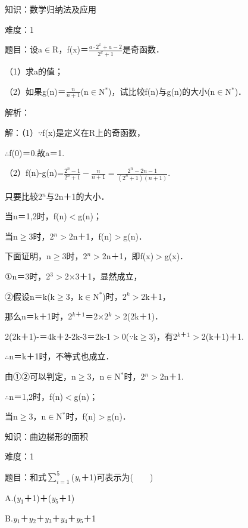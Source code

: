 \documentclass{article} %
\begin{document}
 知识：数学归纳法及应用

 难度：1

 题目：设a$\mathrm{\in}$R，f(x)＝$\frac{a\cdot 2^x+a-2}{2^x+1}$是奇函数．

（1）求a的值；

（2）如果g(n)＝$\frac{n}{n+1}$(n$\mathrm{\in}$N${}^{*}$)，试比较f(n)与g(n)的大小(n$\mathrm{\in}$N${}^{*}$)．

 解析：

 解：（1）$\mathrm{\because}$f(x)是定义在R上的奇函数，

$\mathrm{\therefore}$f(0)＝0.故a＝1.

（2）f(n)-g(n)=$\frac{2^n-1}{2^n+1}-\frac{n}{n+1}=\frac{2^n-2n-1}{(2^n+1)(n+1)}$.

只要比较2${}^{n}$与2n＋1的大小．

当n＝1,2时，f(n)$\mathrm{<}$g(n)；

当n$\mathrm{\ge}$3时，2${}^{n}$$\mathrm{>}$2n＋1，f(n)$\mathrm{>}$g(n)．

下面证明，n$\mathrm{\ge}$3时，2${}^{n}$$\mathrm{>}$2n＋1，即f(x)$\mathrm{>}$g(x)．

①n＝3时，2${}^{3}$$\mathrm{>}$2$\mathrm{\times}$3＋1，显然成立，

②假设n＝k(k$\mathrm{\ge}$3，k$\mathrm{\in}$N${}^{*}$)时，2${}^{k}$$\mathrm{>}$2k＋1，

那么n＝k＋1时，2${}^{k}$${}^{\textrm{＋}}$${}^{1}$＝2$\mathrm{\times}$2${}^{k}$$\mathrm{>}$2(2k＋1)．

2(2k＋1)-＝4k＋2-2k-3＝2k-1$\mathrm{>}$0($\mathrm{\because}$k$\mathrm{\ge}$3)，有2${}^{k}$${}^{\textrm{＋}}$${}^{1}$$\mathrm{>}$2(k＋1)＋1.

$\mathrm{\therefore}$n＝k＋1时，不等式也成立．

由①②可以判定，n$\mathrm{\ge}$3，n$\mathrm{\in}$N${}^{*}$时，2${}^{n}$$\mathrm{>}$2n＋1.

$\mathrm{\therefore}$n＝1,2时，f(n)$\mathrm{<}$g(n)；

当n$\mathrm{\ge}$3，n$\mathrm{\in}$N${}^{*}$时，f(n)$\mathrm{>}$g(n)．

 

 知识：曲边梯形的面积

 难度：1

 题目：和式$\sum\limits_{i=1}^5$(\textit{y${}_{i}$}＋1)可表示为(　　)

A.(\textit{y}${}_{1}$＋1)＋(\textit{y}${}_{5}$＋1)

B.\textit{y}${}_{1}$＋\textit{y}${}_{2}$＋\textit{y}${}_{3}$＋\textit{y}${}_{4}$＋\textit{y}${}_{5}$＋1
\end{document}
